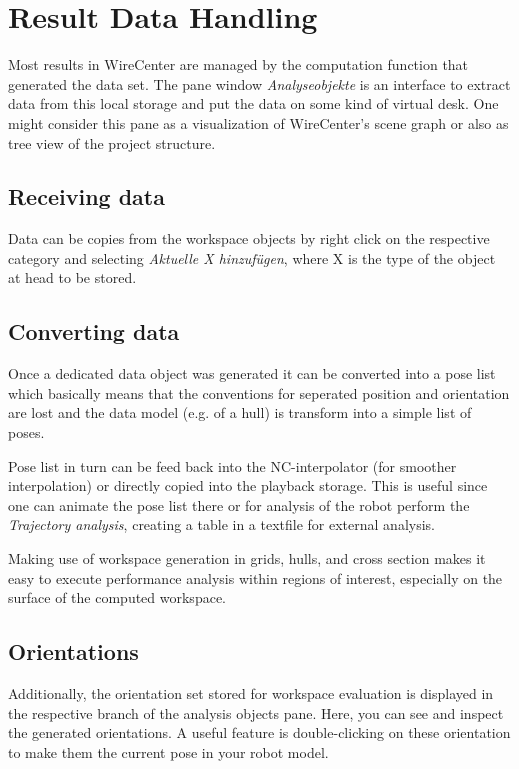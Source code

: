 \documentclass[11pt,a4paper,onepage,openany]{book}
\begin{document}
\chapter{Result Data Handling}
Most results in WireCenter are managed by the computation function that
generated the data set. The pane window \emph{Analyseobjekte} is an interface
to extract data from this local storage and put the data on some kind of
virtual desk. One might consider this pane as a visualization of WireCenter's
scene graph or also as tree view of the project structure.

\section{Receiving data}
Data can be copies from the workspace objects by right click on the respective
category and selecting \emph{Aktuelle X hinzuf\"ugen}, where X is the type of
the object at head to be stored.

\section{Converting data}
Once a dedicated data object was generated it can be converted into a pose list
which basically means that the conventions for seperated position and
orientation are lost and the data model (e.g. of a hull) is transform into a
simple list of poses.

Pose list in turn can be feed back into the NC-interpolator (for smoother
interpolation) or directly copied into the playback storage. This is useful
since one can animate the pose list there or for analysis of the robot perform
the \emph{Trajectory analysis}, creating a table in a textfile for external
analysis.

Making use of workspace generation in grids, hulls, and cross section makes it
easy to execute performance analysis within regions of interest, especially on
the surface of the computed workspace.

\section{Orientations}
Additionally, the orientation set stored for workspace evaluation is displayed
in the respective branch of the analysis objects pane. Here, you can see and
inspect the generated orientations. A useful feature is double-clicking on
these orientation to make them the current pose in your robot model.
\end{document}

